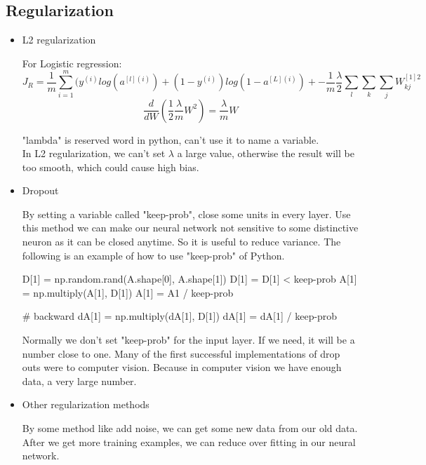 \documentclass[10pt]{article}
\begin{document}
 \subsection{Regularization}
 \begin{itemize}
 \item{L2 regularization}
 \begin{flushleft}
 For Logistic regression:\\
 $$J_{R} = \frac{1}{m}\sum_{i=1}^{m}(y^{(i)}log(a^{[l](i)})+(1-y^{(i)})log(1-a^{[L](i)}) + -\frac{1}{m}\frac{\lambda}{2}\sum_{l}\sum_{k}\sum_{j}W_{kj}^{[1]2}$$
$$\frac{d}{dW}(\frac{1}{2}\frac{\lambda}{m}W^{2})=\frac{\lambda}{m}W $$

 "lambda" is reserved word in python, can't use it to name a variable.\\ In L2 regularization, we can't set $\lambda$ a large value, otherwise the result will be too smooth, which could cause high bias.
 \end{flushleft}
 
 
 \item Dropout
 \begin{flushleft}
 By setting a variable called "keep-prob", close some units in every layer. Use this method we can make our neural network not sensitive to some distinctive neuron as it can be closed anytime. So it is useful to reduce variance. The following is an example of how to use "keep-prob" of Python.
 
 \begin{python}
 D[1] = np.random.rand(A.shape[0], A.shape[1])
 D[1] = D[1] < keep-prob
 A[1] = np.multiply(A[1], D[1])
 A[1] = A1 / keep-prob
 
 # backward
 dA[1] = np.multiply(dA[1], D[1])
 dA[1] = dA[1] / keep-prob
 \end{python}
  Normally we don't set "keep-prob" for the input layer. If we need, it will be a number close to one.  Many of the first successful implementations of drop outs were to computer vision. Because in computer vision we have enough data, a very large number.
 \end{flushleft}
 
 \item Other regularization methods
 \begin{flushleft}
 By some method like add noise, we can get some new data from our old data. After we get more training examples, we can reduce over fitting in our neural network.
 \end{flushleft}
 \end{itemize}
 
\end{document}
